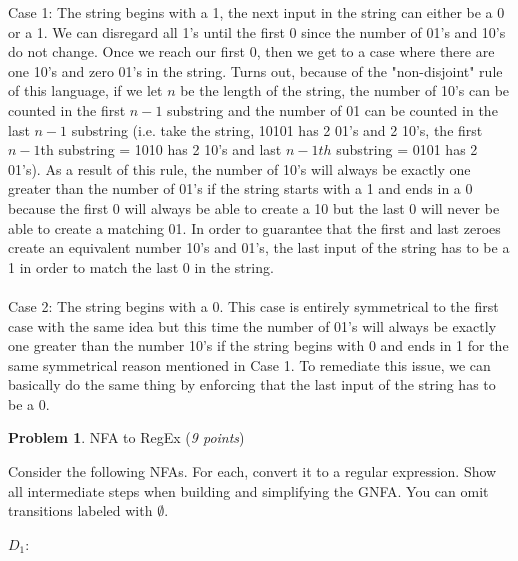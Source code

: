 \documentclass[11pt]{article}
\theoremstyle{definition}
\theoremstyle{theorem}
\newtheorem{prob}{Problem}
\begin{document}
\noindent Case 1: The string begins with a 1, the next input in the string can either be a 0 or a 1. We can disregard all 1's until the first 0 since the number of 01's and 10's do not change. Once we reach our first 0, then we get to a case where there are one 10's and zero 01's in the string. Turns out, because of the "non-disjoint" rule of this language, if we let $n$ be the length of the string, the number of 10's can be counted in the first $n-1$ substring and the number of 01 can be counted in the last $n-1$ substring (i.e. take the string, 10101 has 2 01's and 2 10's, the first $n-1$th substring = 1010 has 2 10's and last $n-1th$ substring = 0101 has 2 01's). 
As a result of this rule, the number of 10's will always be exactly one greater than the number of 01's if the string starts with a 1 and ends in a 0 because the first 0 will always be able to create a 10 but the last 0 will never be able to create a matching 01.  
In order to guarantee that the first and last zeroes create an equivalent number 10's and 01's, the last input of the string has to be a 1 in order to match the last 0 in the string. \\~\\

\noindent Case 2: The string begins with a 0. This case is entirely symmetrical to the first case with the same idea but this time the number of 01's will always be exactly one greater than the number 10's if the string begins with 0 and ends in 1 for the same symmetrical reason mentioned in Case 1. To remediate this issue, we can basically do the same thing by enforcing that the last input of the string has to be a 0.
\newpage

\begin{prob} NFA to RegEx (\emph{9 points})\end{prob}

Consider the following NFAs. For each, convert it to a regular expression. Show all intermediate steps when building and simplifying the GNFA. You can omit transitions labeled with $\emptyset$.

$D_1$:

\\
\end{document}
